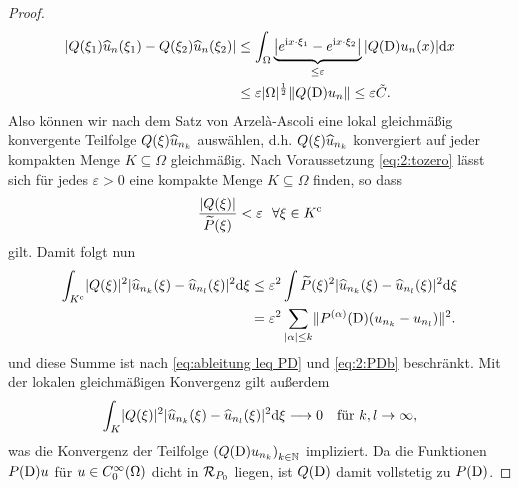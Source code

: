 \begin{proof}
\begin{align}
| Q(\xi_1)\widehat{u}_n(\xi_1) - Q(\xi_2)\widehat{u}_n(\xi_2)| & \leq \int_{\Omega}  \underbrace{\left| e^{\mathrm i x \cdot \xi_1} - e^{\mathrm i x \cdot \xi_2} \right| }_{\leq \varepsilon} | Q(\mathrm D) u_n(x)| \mathrm{d}x 
\\ & \leq \varepsilon |\Omega|^{\frac{1}{2}} \Vert Q(\mathrm D)u_n \Vert \leq \varepsilon \tilde{C}.
\end{align}
Also können wir nach dem Satz von Arzel\`a-Ascoli eine lokal gleichmäßig konvergente Teilfolge $Q(\xi)\widehat{u}_{n_k}$ auswählen, d.h. $Q(\xi)\widehat{u}_{n_k}$ konvergiert auf jeder kompakten Menge $K \subseteq \Omega$ gleichmäßig.
Nach Voraussetzung \eqref{eq:2:tozero} lässt sich für jedes $\varepsilon > 0$ eine kompakte Menge $K \subseteq \Omega$ finden, so dass 
\begin{equation}
\frac{\abs{Q(\x)}}{\til{P}(\x)} <\varepsilon \ \ \forall \x \in K^{\mathrm{c}}
\end{equation}
gilt. Damit folgt nun
\begin{align}
\int_{K^{\mathrm c}}\lvert Q(\xi)\rvert^2\lvert\widehat{u}_{n_k}(\xi)-\widehat{u}_{n_l}(\xi)\rvert^2\mathrm{d}\xi
&\leq\varepsilon^2\int\widetilde{P}(\xi)^2\lvert\widehat{u}_{n_k}(\xi)-\widehat{u}_{n_l}(\xi)\rvert^2\mathrm{d}\xi\\
&=\varepsilon^2\sum_{|\alpha| \leq k}\lVert P^{(\alpha)}(\mathrm D)(u_{n_k}-u_{n_l})\rVert^2.\label{eq:2:Kcsum}
\end{align}
und diese Summe ist nach \eqref{eq:ableitung leq PD}
und \eqref{eq:2:PDb} beschränkt.
Mit der lokalen gleichmäßigen Konvergenz gilt außerdem
\begin{equation}
\int_K\lvert Q(\xi)\rvert^2\lvert\widehat{u}_{n_k}(\xi)-\widehat{u}_{n_l}(\xi)\rvert^2\mathrm{d}\xi\longrightarrow0
\quad\text{für}~ k,l \rightarrow \infty,
\end{equation}
was die Konvergenz der Teilfolge $\left(Q(\mathrm D)u_{n_k} \right)_{k \in \mathbb{N}}$ impliziert. Da die Funktionen $P(\mathrm D)u$ für $u\in C^\infty_0(\Omega)$ dicht in $\mathcal R_{P_0}$ liegen, ist $Q(\mathrm D)$ damit vollstetig zu $P(\mathrm D)$.


\end{proof}
